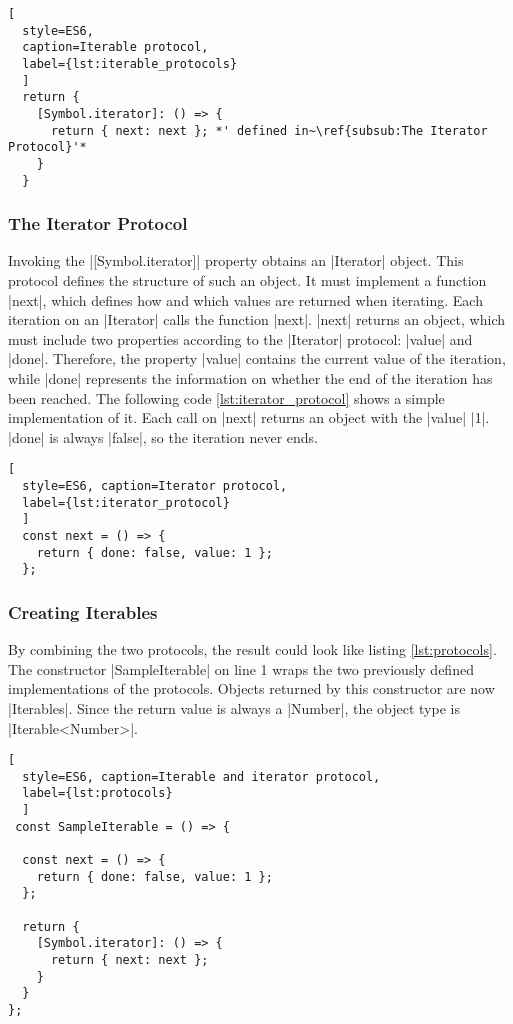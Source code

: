 \begin{lstlisting}[
  style=ES6, 
  caption=Iterable protocol,
  label={lst:iterable_protocols}
  ]
  return {
    [Symbol.iterator]: () => {
      return { next: next }; *' defined in~\ref{subsub:The Iterator Protocol}'*
    }
  }
\end{lstlisting}

\subsubsection{The Iterator Protocol}
\label{subsub:The Iterator Protocol}
Invoking the |[Symbol.iterator]| property obtains an |Iterator| object.
This protocol defines the structure of such an object. It must 
implement a function |next|, which defines how and which values are returned 
when iterating.
Each iteration on an |Iterator| calls the function |next|. |next| returns an object, which must
include two properties according to the |Iterator| protocol: |value| and |done|.
Therefore, the property |value| contains the current value of the iteration,
while |done| represents the information on whether the end of the iteration has 
been reached. The following code \ref{lst:iterator_protocol} shows a simple 
implementation of it. Each call on |next| returns an object with the |value| 
|1|. |done| is always |false|, so the iteration never ends. 

\begin{lstlisting}[
  style=ES6, caption=Iterator protocol,
  label={lst:iterator_protocol}
  ]
  const next = () => {
    return { done: false, value: 1 };
  };
\end{lstlisting}

\subsubsection{Creating Iterables}
\label{subsub:Creating Iterables}
By combining the two protocols, the result could look like listing
\ref{lst:protocols}. The constructor |SampleIterable| on line 1 wraps the two previously
defined implementations of the protocols. Objects returned by this constructor 
are now |Iterables|. Since the return value is always a |Number|, the object type
is |Iterable<Number>|.

\begin{lstlisting}[
  style=ES6, caption=Iterable and iterator protocol,
  label={lst:protocols}
  ]
 const SampleIterable = () => {

  const next = () => {
    return { done: false, value: 1 };
  };

  return {
    [Symbol.iterator]: () => {
      return { next: next };
    }
  }
};
\end{lstlisting}

